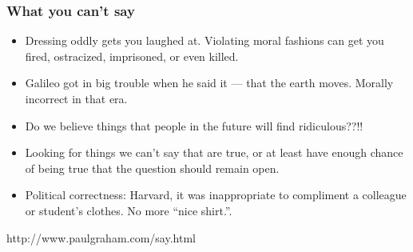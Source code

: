 \begin{frame}[fragile]\frametitle{What you can't say}

\begin{itemize}
\item Dressing oddly gets you laughed at. Violating moral fashions can get you fired, ostracized, imprisoned, or even killed.
\item Galileo got in big trouble when he said it — that the earth moves. Morally incorrect in that era.
\item Do we believe things that people in the future will find ridiculous??!!
\item Looking for things we can't say that are true, or at least have enough chance of being true that the question should remain open. 
\item Political correctness:  Harvard, it was inappropriate to compliment a colleague or student's clothes. No more ``nice shirt.''.
\end{itemize}



{\tiny http://www.paulgraham.com/say.html}

\end{frame}
